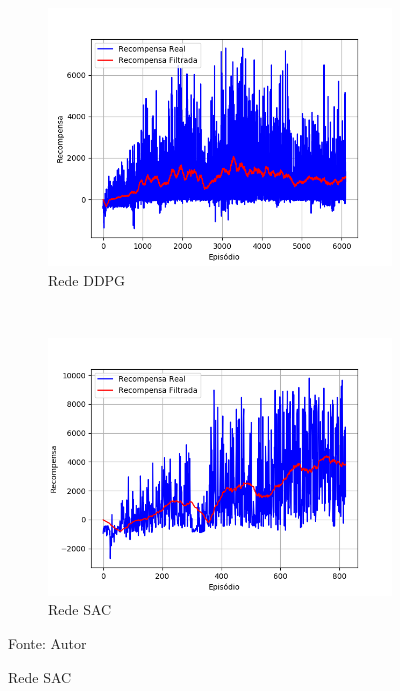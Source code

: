 \vspace{0.25cm} 
\begin{figure}[H]
\caption{Recompensas do terceiro ambiente simulado}
    \begin{center}
    \begin{subfigure}[b]{0.48\textwidth}
        \includegraphics[width=\textwidth]{imagens/simulated_envs/ddpg_stage_4.png}
        \caption{Rede DDPG}
        \label{subfig:ddpg_stage_4}
    \end{subfigure}
    ~
    \begin{subfigure}[b]{0.48\textwidth}
        \includegraphics[width=\textwidth]{imagens/simulated_envs/sac_stage_4.png}
        \caption{Rede SAC}
        \label{subfig:sac_stage_4}
    \end{subfigure}
    \end{center}
    \label{fig:stage_4}
\small{Fonte: Autor}
\end{figure}

